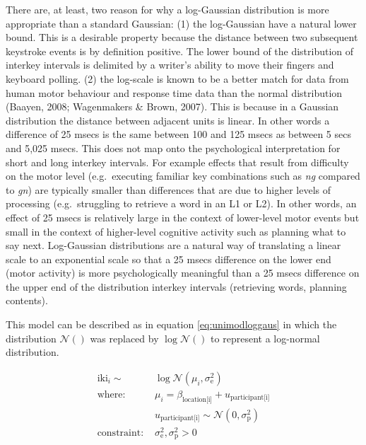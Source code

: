 \documentclass[
  man,floatsintext]{apa7}
\begin{document}
There are, at least, two reason for why a log-Gaussian distribution is more appropriate than a standard Gaussian: (1) the log-Gaussian have a natural lower bound. This is a desirable property because the distance between two subsequent keystroke events is by definition positive. The lower bound of the distribution of interkey intervals is delimited by a writer's ability to move their fingers and keyboard polling. (2) the log-scale is known to be a better match for data from human motor behaviour and response time data than the normal distribution (Baayen, 2008; Wagenmakers \& Brown, 2007). This is because in a Gaussian distribution the distance between adjacent units is linear. In other words a difference of 25 msecs is the same between 100 and 125 msecs as between 5 secs and 5,025 msecs. This does not map onto the psychological interpretation for short and long interkey intervals. For example effects that result from difficulty on the motor level (e.g.~executing familiar key combinations such as \emph{ng} compared to \emph{gn}) are typically smaller than differences that are due to higher levels of processing (e.g.~struggling to retrieve a word in an L1 or L2). In other words, an effect of 25 msecs is relatively large in the context of lower-level motor events but small in the context of higher-level cognitive activity such as planning what to say next. Log-Gaussian distributions are a natural way of translating a linear scale to an exponential scale so that a 25 msecs difference on the lower end (motor activity) is more psychologically meaningful than a 25 msecs difference on the upper end of the distribution interkey intervals (retrieving words, planning contents).

This model can be described as in equation \ref{eq:unimodloggaus} in which the distribution \(\mathcal{N}()\) was replaced by \(\log\mathcal{N}()\) to represent a log-normal distribution.

\begin{equation}
\begin{aligned}
\label{eq:unimodloggaus}
\text{iki}_i \sim\text{ } & \log\mathcal{N}(\mu_i, \sigma_\text{e}^2) \\
\text{where: } &
\mu_i = \beta_\text{location[i]} + u_\text{participant[i]}\\
& u_\text{participant[i]} \sim \mathcal{N}(0, \sigma_\text{p}^2) \\
\text{constraint: } & \sigma_\text{e}^2, \sigma_\text{p}^2>0
\end{aligned}
\end{equation}
\end{document}
